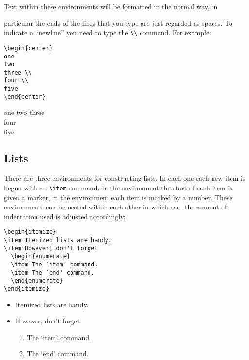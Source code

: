 Text within these environments will be formatted in the normal way, in
{\samepage
particular the ends of the lines that you type are just regarded as spaces.  To
indicate a ``newline'' you need to type the \verb|\\| command.  For example:
\egstart
\begin{verbatim}
\begin{center}
one
two
three \\
four \\
five
\end{center}
\end{verbatim}
\egmid%
\begin{center}
one
two
three \\
four \\
five
\end{center}
\egend
}

\subsection{Lists}

There are three environments for constructing lists.  In each one each new
item is begun with an \verb|\item| command.  In the  environment
the start of each item is given a marker, in the 
environment each item is marked by a number.  These environments can be nested
within each other in which case the amount of indentation used
is adjusted accordingly:
\egstart
\begin{verbatim}
\begin{itemize}
\item Itemized lists are handy.
\item However, don't forget
  \begin{enumerate}
  \item The `item' command.
  \item The `end' command.
  \end{enumerate}
\end{itemize}
\end{verbatim}
\egmid%
\begin{itemize}
\item Itemized lists are handy.
\item However, don't forget
  \begin{enumerate}
  \item The `item' command.
  \item The `end' command.
  \end{enumerate}
\end{itemize}
\egend


